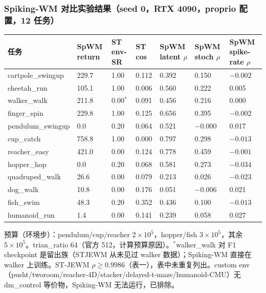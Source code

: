 \documentclass[11pt,a4paper]{article}
\begin{document}
\subsubsection{Spiking-WM 对比实验结果（seed 0，RTX 4090，proprio 配置，12 任务）}

\begin{longtable}{p{}p{}p{}p{}p{}p{}p{}}
\toprule
任务 & SpWM return & ST env-SR & ST cos & SpWM latent $\rho$ & SpWM stoch $\rho$ & SpWM spike-rate $\rho$ \\
\midrule
cartpole\_swingup & 229.7 & 1.00 & 0.112 & 0.392 & 0.150 & $-0.002$ \\
cheetah\_run & 105.1 & 1.00 & 0.006 & 0.560 & 0.222 & 0.005 \\
walker\_walk & 211.8 & 0.00$^{*}$ & 0.091 & 0.456 & 0.216 & 0.000 \\
finger\_spin & 229.8 & 1.00 & 0.125 & 0.656 & 0.395 & $-0.002$ \\
pendulum\_swingup & 0.0 & 0.20 & 0.064 & 0.521 & $-0.000$ & 0.017 \\
cup\_catch & 758.8 & 1.00 & 0.000 & 0.797 & 0.298 & $-0.013$ \\
reacher\_easy & 421.0 & 0.00 & 0.124 & 0.778 & 0.459 & $-0.001$ \\
hopper\_hop & 0.0 & 0.20 & 0.068 & 0.581 & 0.273 & $-0.034$ \\
quadruped\_walk & 26.6 & 0.00 & 0.079 & 0.213 & 0.026 & $-0.023$ \\
dog\_walk & 10.8 & 0.00 & 0.176 & 0.051 & $-0.006$ & 0.021 \\
fish\_swim & 48.3 & 0.20 & 0.352 & 0.436 & 0.100 & $-0.013$ \\
humanoid\_run & 1.4 & 0.00 & 0.141 & 0.239 & 0.058 & 0.027 \\
\bottomrule
\end{longtable}

预算（环境步）：pendulum/cup/reacher $2\times10^5$，hopper/fish $3\times10^5$，其余 $5\times10^5$。trian\_ratio 64（官方 512，计算预算原因）。$^{*}$walker\_walk 对 F1 checkpoint 是留出族（STJEWM 从未见过 walker 数据）；Spiking-WM 直接在 walker 上训练。ST-JEWM $\rho \geq 0.9986$（表一），表中未重复列出。custom env（pusht/tworoom/reacher-4D/stacker/delayed-t-maze/humanoid-CMU）无 dm\_control 等价物，Spiking-WM 无法运行，已排除。
\end{document}
